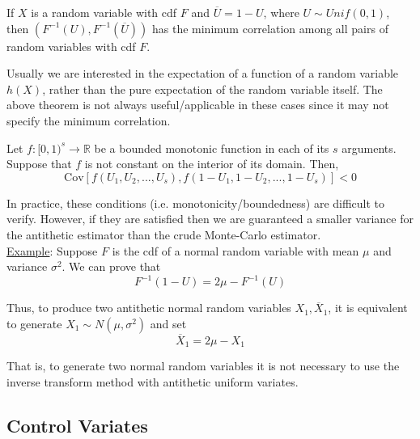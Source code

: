 \documentclass[12pt]{article}
\newenvironment{theorem}[2][Theorem:]{\begin{trivlist} %
\item[\hskip \labelsep {\bfseries #1}\hskip \labelsep {\bfseries #2.}]}{\end{trivlist}}
\newlength\tindent
\renewcommand{\indent}{\hspace*{\tindent}}
\begin{document}
\begin{theorem}{Minimum correlation between random variables} If $X$ is a random variable with cdf $F$ and $\overline{U} = 1 - U$, where $U\sim Unif(0,1)$, then $(F^{-1}(U), F^{-1}(\overline{U}))$ has the minimum correlation among all pairs of random variables with cdf $F$.
\end{theorem}

\indent Usually we are interested in the expectation of a function of a random variable $h(X)$, rather than the pure expectation of the random variable itself. The above theorem is not always useful/applicable in these cases since it may not specify the minimum correlation.

\begin{theorem}{Covariance of monotone functions of antithetic variables} Let $f: [0,1)^s \to \mathbb R$ be a bounded monotonic function in each of its $s$ arguments. Suppose that $f$ is not constant on the interior of its domain. Then,
\begin{equation*}
	\mathrm{Cov}[f(U_1, U_2, ..., U_s), f(1 - U_1, 1 - U_2, ..., 1 - U_s)] < 0 
\end{equation*}
\end{theorem}

\indent In practice, these conditions (i.e. monotonicity/boundedness) are difficult to verify. However, if they are satisfied then we are guaranteed a smaller variance for the antithetic estimator than the crude Monte-Carlo estimator. \\

\underline{Example}: Suppose $F$ is the cdf of a normal random variable with mean $\mu$ and variance $\sigma^2$. We can prove that
\begin{equation*}
	F^{-1}(1 - U) = 2\mu - F^{-1}(U)
\end{equation*}

\indent Thus, to produce two antithetic normal random variables $X_1, \overline{X}_1$, it is equivalent to generate $X_1 \sim N(\mu,\sigma^2)$ and set
\begin{equation*}
	\overline{X}_1 = 2\mu - X_1
\end{equation*}

\indent That is, to generate two normal random variables it is not necessary to use the inverse transform method with antithetic uniform variates.

\subsection{Control Variates}
\end{document}
